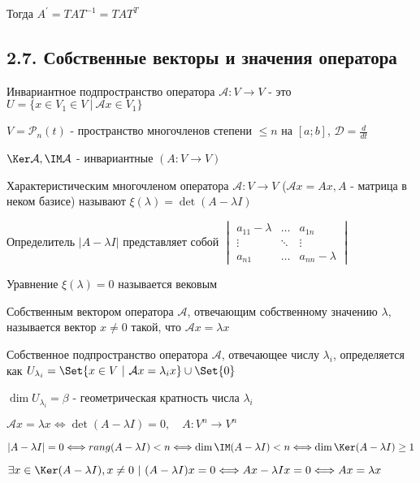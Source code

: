 \documentclass[12pt]{article}
\begin{document}
    \Nota Тогда $A^\prime = T A T^{-1} = T A T^T$


    \subsection[p2\_7]{2.7. Собственные векторы и значения оператора}

    \Def Инвариантное подпространство оператора $\mathcal{A} : V \rightarrow V$ -
    это $U = \{x \in V_1 \in V \ | \ \mathcal{A}x \in V_1\}$

    \Ex $V = \mathcal{P}_n(t)$ - пространство многочленов степени $\leq n$ на $[a; b]$, $\mathcal{D} = \frac{d}{dt}$

    \Nota $\Ker \mathcal{A}, \IM \mathcal{A}$ - инвариантные $(A : V \rightarrow V)$

    \hypertarget{eigenvalue}{}

    \Def Характеристическим многочленом оператора $\mathcal{A} : V \rightarrow V$
    ($\mathcal{A}x = Ax, A$ - матрица в неком базисе) называют $\xi(\lambda) = \det(A - \lambda I)$

    \Nota Определитель $|A - \lambda I|$ представляет собой $\begin{vmatrix}a_{11} - \lambda & \dots & a_{1n} \\ \vdots & \ddots & \vdots \\ a_{n1} & \dots & a_{nn} - \lambda \end{vmatrix}$

    \Nota Уравнение $\xi(\lambda) = 0$ называется вековым

    \hypertarget{eigenvector}{}

    \Def Собственным вектором оператора $\mathcal{A}$, отвечающим собственному значению $\lambda$,
    называется вектор $x \neq 0$ такой, что $\mathcal{A}x = \lambda x$

    \Defs Собственное подпространство оператора $\mathcal{A}$, отвечающее числу $\lambda_i$, определяется как $U_{\lambda_i} = \Set{x \in V \ | \ \mathcal{A}x = \lambda_i x} \union \Set{0}$

    \Defs $\dim U_{\lambda_i} = \beta$ - геометрическая кратность числа $\lambda_i$

    \begin{MyTheorem}
        \Ths $\mathcal{A}x = \lambda x \Longleftrightarrow \det(A - \lambda I) = 0, \quad A : V^n \rightarrow V^n$
    \end{MyTheorem}

    \begin{MyProof}
        $|A - \lambda I| = 0 \Longleftrightarrow rang (A - \lambda I) < n \Longleftrightarrow
        \dim \IM (A - \lambda I) < n \Longleftrightarrow \dim \Ker (A - \lambda I) \geq 1$

        $\exists x \in \Ker (A - \lambda I), x \neq 0 \ | \ (A - \lambda I) x = 0 \Longleftrightarrow Ax - \lambda I x = 0 \Longleftrightarrow Ax = \lambda x$
    \end{MyProof}
\end{document}
